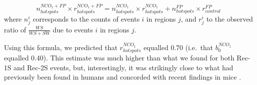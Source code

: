 





\begin{equation*}
	n_{hotspots}^{NCO_1 + FP} \times r_{hotspots}^{NCO_1 + FP}  = n_{hotspots}^{NCO_1} \times r_{hotspots}^{NCO_1} + n_{hotspots}^{FP} \times r_{control}^{FP}
\end{equation*}
where $n_{j}^{i}$ corresponds to the counts of events $i$ in regions $j$, and $r_{j}^{i}$ to the observed ratio of $\frac{WS}{WS+SW}$ due to events $i$ in regions $j$.


Using this formula, we predicted that $r_{hotspots}^{NCO_1}$ equalled 0.70 (i.e.\ that $b_0^{NCO_1}$ equalled 0.40). 
This estimate was much higher than what we found for both Rec-1S and Rec-2S events, but, interestingly, it was strikingly close to what had previously been found in humans \citep{halldorsson2016rate} and concorded with recent findings in mice \citep{li2018highresolution}.\\


